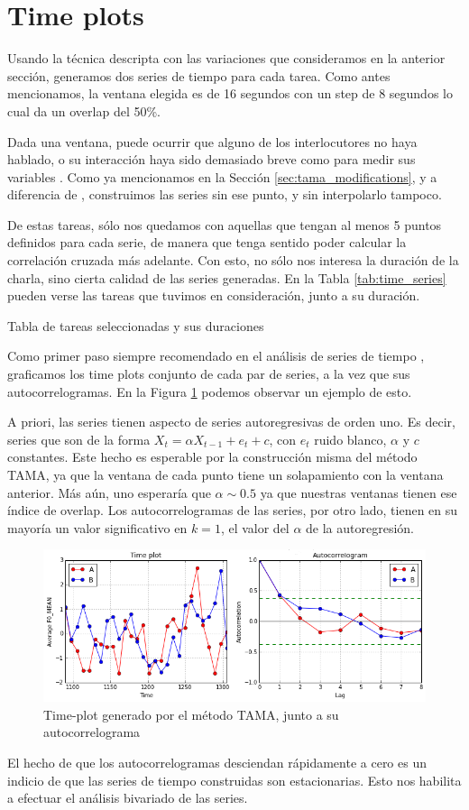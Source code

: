 \section{Time plots}
\label{sec:time_plots}
Usando la técnica descripta con las variaciones que consideramos en la anterior sección, generamos dos series de tiempo para cada tarea. Como antes mencionamos, la ventana elegida es de 16 segundos con un step de 8 segundos lo cual da un overlap del 50\%.

Dada una ventana, puede ocurrir que alguno de los interlocutores no haya hablado, o su interacción haya sido demasiado breve como para medir sus variables \ap. Como ya mencionamos en la Sección \ref{sec:tama_modifications}, y a diferencia de \cite{KOU2008.2}, construimos las series sin ese punto, y sin interpolarlo tampoco.

De estas tareas, sólo nos quedamos con aquellas que tengan al menos 5 puntos definidos para cada serie, de manera que tenga sentido poder calcular la correlación cruzada más adelante. Con esto, no sólo nos interesa la duración de la charla, sino cierta calidad de las series generadas. En la Tabla \ref{tab:time_series} pueden verse las tareas que tuvimos en consideración, junto a su duración.

\begin{table}
\centering

\caption{Tabla de tareas seleccionadas y sus duraciones}
\label{tab:time_series}
\end{table}


Como primer paso siempre recomendado en el análisis de series de tiempo \cite{CHATFIELD}, graficamos los time plots conjunto de cada par de series, a la vez que sus autocorrelogramas. En la Figura \ref{fig:time_plot} podemos observar un ejemplo de esto.

A priori, las series tienen aspecto de series autoregresivas de orden uno. Es decir, series que son de la forma $X_t = \alpha X_{t-1} + e_t + c$, con $e_t$ ruido blanco, $\alpha$ y $c$ constantes. Este hecho es esperable  por la construcción misma del método TAMA, ya que la ventana de cada punto tiene un solapamiento con la ventana anterior. Más aún, uno esperaría que $\alpha \sim 0.5$ ya que nuestras ventanas tienen ese índice de overlap. Los autocorrelogramas de las series, por otro lado, tienen en su mayoría un valor significativo en $k = 1$, el valor del $\alpha$ de la autoregresión.


\begin{figure}
\centering
\includegraphics[width=15cm]{images/time_plot_with_autocorrelation.png}
\caption{Time-plot generado por el método TAMA, junto a su autocorrelograma}
\label{fig:time_plot}
\end{figure}

El hecho de que los autocorrelogramas desciendan rápidamente a cero es un indicio de que las series de tiempo construidas son estacionarias. Esto nos habilita a efectuar el análisis bivariado de las series.
